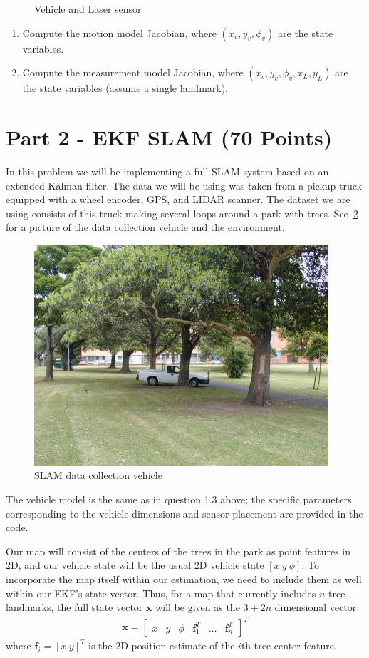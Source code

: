 \documentclass{article}
\newcommand{\mat}[1]{\bm{#1}}
\newcommand{\bmat}[1]{\begin{bmatrix} #1 \end{bmatrix}}
\begin{document}
\begin{enumerate}
\begin{figure}[H]
    \caption{Vehicle and Laser sensor}
    \label{fig:truck_kinematics_2}
\end{figure}
\begin{enumerate}
    \item Compute the motion model Jacobian, where $(x_v,y_v,\phi_v)$ are the state variables.
    \item Compute the measurement model Jacobian, where $(x_v,y_v,\phi_v,x_L,y_L)$ are the state variables (assume a single landmark).
\end{enumerate}

    \end{enumerate} 


\section{Part 2 - EKF SLAM (70 Points)}

In this problem we will be implementing a full SLAM system based on an extended Kalman filter.
The data we will be using was taken from a pickup truck equipped with a wheel encoder, GPS, and LIDAR scanner. 
The dataset we are using consists of this truck making several loops around a park with trees. 
See~\ref{fig:vic_truck} for a picture of the data collection vehicle and the environment.
\begin{figure}
    \centering
    \includegraphics[width=0.8\linewidth]{truck.jpg}
    \caption{SLAM data collection vehicle}
    \label{fig:vic_truck}
\end{figure}
The vehicle model is the same as in question 1.3 above; the specific parameters corresponding to the vehicle dimensions and sensor placement are provided in the code.

Our map will consist of the centers of the trees in the park as point features in 2D, and our vehicle state will be the usual 2D vehicle state $[x\ y\ \phi]$.
To incorporate the map itself within our estimation, we need to include them as well within our EKF's state vector.
Thus, for a map that currently includes $n$ tree landmarks, the full state vector $\mat{x}$ will be given as the $3+2n$ dimensional vector
\begin{align}
    \mat{x}= \bmat{x & y & \phi & \mat{f}_1^T & \dots & \mat{f}_n^T}^T
\end{align}
where $\mat{f}_i = [x \ y]^T$ is the 2D position estimate of the $i$th tree center feature. 
\end{document}
